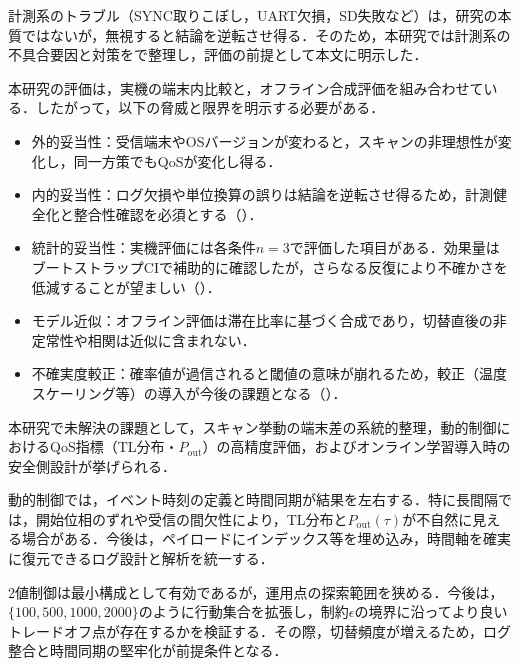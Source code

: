 計測系のトラブル（SYNC取りこぼし，UART欠損，SD失敗など）は，研究の本質ではないが，無視すると結論を逆転させ得る．そのため，本研究では計測系の不具合要因と対策をで整理し，評価の前提として本文に明示した．

本研究の評価は，実機の端末内比較と，オフライン合成評価を組み合わせている．したがって，以下の脅威と限界を明示する必要がある．
\begin{itemize}
  \item 外的妥当性：受信端末やOSバージョンが変わると，スキャンの非理想性が変化し，同一方策でもQoSが変化し得る．
  \item 内的妥当性：ログ欠損や単位換算の誤りは結論を逆転させ得るため，計測健全化と整合性確認を必須とする（）．
  \item 統計的妥当性：実機評価には各条件$n=3$で評価した項目がある．効果量はブートストラップCIで補助的に確認したが，さらなる反復により不確かさを低減することが望ましい（）．
  \item モデル近似：オフライン評価は滞在比率に基づく合成であり，切替直後の非定常性や相関は近似に含まれない．
  \item 不確実度較正：確率値が過信されると閾値の意味が崩れるため，較正（温度スケーリング等）の導入が今後の課題となる（）．
\end{itemize}

本研究で未解決の課題として，スキャン挙動の端末差の系統的整理，動的制御におけるQoS指標（TL分布・$P_{\mathrm{out}}$）の高精度評価，およびオンライン学習導入時の安全側設計が挙げられる．

動的制御では，イベント時刻の定義と時間同期が結果を左右する．特に長間隔では，開始位相のずれや受信の間欠性により，TL分布と$P_{\mathrm{out}}(\tau)$が不自然に見える場合がある．今後は，ペイロードにインデックス等を埋め込み，時間軸を確実に復元できるログ設計と解析を統一する．

2値制御は最小構成として有効であるが，運用点の探索範囲を狭める．今後は，$\{100,500,1000,2000\}$のように行動集合を拡張し，制約$\epsilon$の境界に沿ってより良いトレードオフ点が存在するかを検証する．その際，切替頻度が増えるため，ログ整合と時間同期の堅牢化が前提条件となる．



